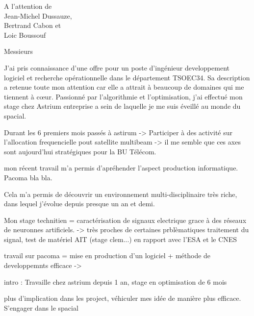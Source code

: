 \documentclass[12pt]{lettre}
\begin{document}
\begin{letter}{A l'attention de\\Jean-Michel Dussauze,\\Bertrand Cabon et\\ Loic Boussouf}
\address{Victor Cameo Ponz\\47 rue Guynemer\\31200 Toulouse}
\nofax

\opening{Messieurs}
J'ai pris connaissance d'une offre pour un poste d'ingénieur developpement logiciel et recherche opérationnelle dans le département TSOEC34.
Sa description a retenue toute mon attention car elle a attrait à beaucoup de domaines qui me tiennent à c\oe{}ur.
Passionné par l’algorithmie et l’optimisation, j'ai effectué mon stage chez Astrium entreprise a sein de laquelle je me suis éveillé au monde du spacial.

Durant les 6 premiers mois passés à astirum -> Participer à des activité sur l'allocation frequencielle pout satellite multibeam -> il me semble que ces axes sont aujourd’hui stratégiques pour la BU Télécom.

mon récent travail m'a permis d'apréhender l'aspect production informatique. Pacoma bla bla.

Cela m’a permis de découvrir un environnement multi-disciplinaire très riche, dans lequel j'évolue depuis presque un an et demi.

Mon stage technitien = caractérisation de signaux electrique grace à des réseaux de neuronnes artificiels. -> très proches de certaines prblèmatiques traitement du signal, test de matériel AIT (stage clem...) en rapport avec l'ESA et le CNES

travail sur pacoma =  mise en production d'un logiciel + méthode de developpemnts efficace ->

intro : Travaille chez astrium depuis 1 an, stage en optimisation de 6 mois

plus d'implication dans les project, véhiculer mes idée de manière plus efficace. S'engager dans le spacial


\end{letter}
\end{document}

